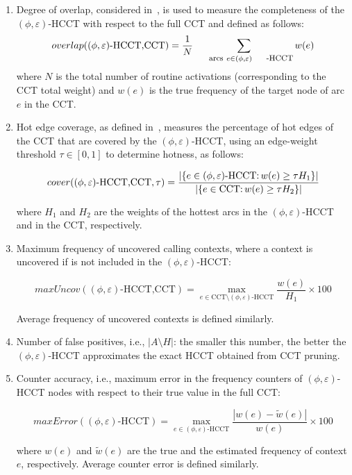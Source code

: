 \documentclass[preprint]{sigplanconf}
\begin{document}
\begin{enumerate}

\item Degree of overlap, considered in~\cite{AR01, AS00, ZSCC06}, is used to measure the completeness of the $(\phi,\varepsilon)$-HCCT with respect to the full CCT and defined as follows:
$$overlap((\phi,\varepsilon){\mbox{-HCCT,CCT}})=\frac{1}{N}\sum_{\mbox{\footnotesize{arcs}}~e\in (\phi,\varepsilon)\mbox{\footnotesize{-HCCT}}}w(e)$$
where $N$ is the total number of routine activations (corresponding to the CCT total weight) and $w(e)$ is the true frequency of the target node of arc $e$ in the CCT.

\item Hot edge coverage, as defined in~\cite{ZSCC06}, measures the percentage of hot edges of the CCT that are covered by the $(\phi,\varepsilon)$-HCCT, using an edge-weight threshold $\tau\in [0,1]$ to determine hotness, as follows:
\begin{small}
$$\hspace{-0mm}cover((\phi,\varepsilon){\mbox{-HCCT,CCT}},\tau)=\frac{|\{e\in(\phi,\varepsilon){\mbox{-HCCT:}}\,w(e)\ge\tau H_{1}\}|}{|\{e\in\mbox{CCT:}\,w(e)\ge\tau H_{2}\}|}$$
\end{small}
where $H_1$ and $H_2$ are the weights of the hottest arcs in the $(\phi,\varepsilon)$-HCCT and in the CCT, respectively.

\item Maximum frequency of uncovered calling contexts, where a context is uncovered if is not included in the $(\phi,\varepsilon)$-HCCT:
\begin{small}
$$maxUncov((\phi,\varepsilon){\mbox{-HCCT,CCT}})=\max_{e\in\mbox{CCT}\setminus(\phi,\varepsilon){\mbox{-HCCT}}}\frac{w(e)}{H_1}\times 100$$
\end{small}
Average frequency of uncovered contexts is defined similarly.

\item Number of false positives, i.e., $|A\setminus H|$: the smaller this number, the better the $(\phi,\varepsilon){\mbox{-HCCT}}$ approximates the exact HCCT obtained from CCT pruning.

\item Counter accuracy, i.e., maximum error in the frequency counters of $(\phi,\varepsilon)$-HCCT nodes with respect to their true value in the full CCT:
\begin{small}
$$maxError((\phi,\varepsilon){\mbox{-HCCT}})=\max_{e\in(\phi,\varepsilon){\mbox{-HCCT}}}\frac{|w(e)-\widetilde{w}(e)|}{w(e)}\times 100$$
\end{small}
where $w(e)$ and $\widetilde{w}(e)$ are the true and the estimated frequency of context $e$, respectively. Average counter error is defined similarly.

\end{enumerate}
\end{document}
